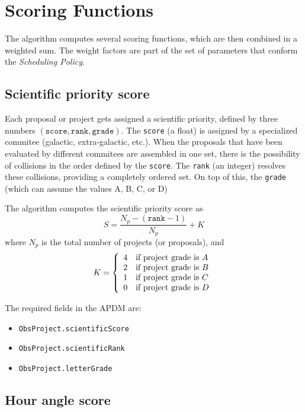 \documentclass{article}
\begin{document}
\section{Scoring Functions}

The algorithm computes several scoring functions, which are then combined in a
weighted sum. The weight factors are part of the set of parameters that conform
the {\em Scheduling Policy}.

\subsection{Scientific priority score}

Each proposal or project gets assigned a scientific priority, defined by three numbers
$(\mathtt{score},\mathtt{rank},\mathtt{grade})$. The {\tt score} (a float) is assigned by
a specialized commitee (galactic, extra-galactic, etc.). When the proposals that have
been evaluated by different commitees are assembled in one set, there is the possibility
of collisions in the order defined by the {\tt score}. The {\tt rank} (an integer) resolves these
collisions, providing a completely ordered set. On top of this, the {\tt grade} (which can assume
the values A, B, C, or D)

The algorithm computes the scientific priority score as
$$
S = \frac{N_p - (\mathtt{rank} - 1)}{N_p} + K
$$
where $N_p$ is the total number of projects (or proposals), and \\
$$
K = \left\{
    \begin{array}{l l}
    4 & \text{if project grade is $A$} \\
    2 & \text{if project grade is $B$}\\
    1 & \text{if project grade is $C$}\\
    0 & \text{if project grade is $D$}
    \end{array} \right . 
$$

The required fields in the APDM are:
\begin{itemize}
\item {\tt ObsProject.scientificScore} 
\item {\tt ObsProject.scientificRank} 
\item {\tt ObsProject.letterGrade} 
\end{itemize}

\subsection{Hour angle score}
\end{document}
